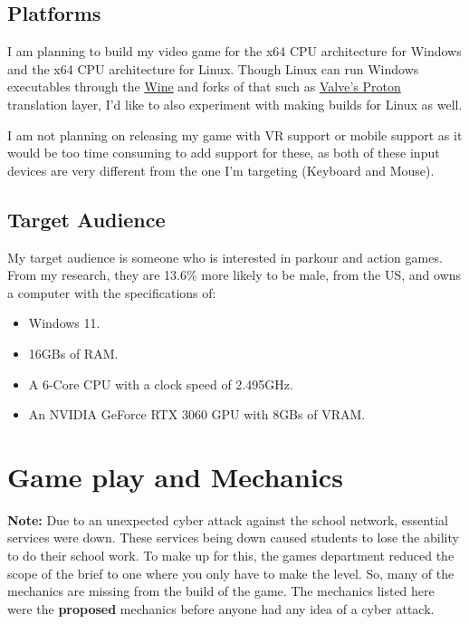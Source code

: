 \documentclass[12pt]{article}
\begin{document}
	\subsection{Platforms}
	I am planning to build my video game for the x64 CPU architecture for Windows and the x64 CPU architecture for Linux. Though Linux can run Windows executables through the \href{https://www.winehq.org}{Wine} and forks of that such as \href{https://github.com/ValveSoftware/Proton}{Valve's Proton} translation layer, I'd like to also experiment with making builds for Linux as well.
	
	I am not planning on releasing my game with VR support or mobile support as it would be too time consuming to add support for these, as both of these input devices are very different from the one I'm targeting (Keyboard and Mouse).
	
	\newpage
	\subsection{Target Audience}
	My target audience is someone who is interested in parkour and action games. From my research, they are 13.6\% more likely to be male, \cite{gameTreeIndustryReports} from the US, \cite{gameDiscoverCoCountryBreakdown} and owns a computer with the specifications of:
	\begin{itemize}
		\item Windows 11.
		\item 16GBs of RAM.
		\item A 6-Core CPU with a clock speed of 2.495GHz.
		\item An NVIDIA GeForce RTX 3060 GPU with 8GBs of VRAM.
	\end{itemize} \cite{steamHardwareSurvey}
	
	\section{Game play and Mechanics}
	\begin{note}
		\textbf{Note:} Due to an unexpected cyber attack against the school network, essential services were down. These services being down caused students to lose the ability to do their school work. To make up for this, the games department reduced the scope of the brief to one where you only have to make the level. So, many of the mechanics are missing from the build of the game. The mechanics listed here were the \textbf{proposed} mechanics before anyone had any idea of a cyber attack.
	\end{note}
\end{document}
